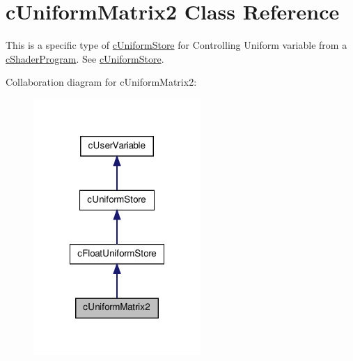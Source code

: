 \hypertarget{classc_uniform_matrix2}{
\section{cUniformMatrix2 Class Reference}
\label{classc_uniform_matrix2}
}


This is a specific type of \hyperlink{classc_uniform_store}{cUniformStore} for Controlling Uniform variable from a \hyperlink{classc_shader_program}{cShaderProgram}. See \hyperlink{classc_uniform_store}{cUniformStore}.  




Collaboration diagram for cUniformMatrix2:\nopagebreak
\begin{figure}[H]
\begin{center}
\leavevmode
\includegraphics[width=180pt]{classc_uniform_matrix2__coll__graph}
\end{center}
\end{figure}
